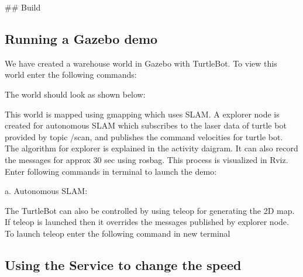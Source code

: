 \#\# Build 
\begin{DoxyCode}{0}
\end{DoxyCode}
 \subsection*{Running a Gazebo demo}

We have created a warehouse world in Gazebo with Turtle\+Bot. To view this world enter the following commands\+: 
\begin{DoxyCode}{0}
\end{DoxyCode}
 The world should look as shown below\+: 

 

This world is mapped using gmapping which uses S\+L\+AM. A explorer node is created for autonomous S\+L\+AM which subscribes to the laser data of turtle bot provided by topic /scan, and publishes the command velocities for turtle bot. The algorithm for explorer is explained in the activity daigram. It can also record the messages for approx 30 sec using rosbag. This process is visualized in Rviz. Enter following commands in terminal to launch the demo\+:

a. Autonomous S\+L\+AM\+: 
\begin{DoxyCode}{0}
\end{DoxyCode}
 The Turtle\+Bot can also be controlled by using teleop for generating the 2D map. If teleop is launched then it overrides the messages published by explorer node. To launch teleop enter the following command in new terminal 
\begin{DoxyCode}{0}
\end{DoxyCode}


\subsection*{Using the Service to change the speed}

